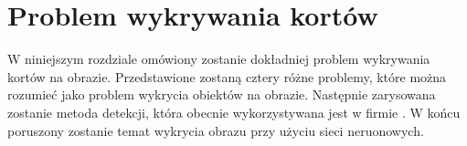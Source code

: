 \chapter{Problem wykrywania kortów}

W niniejszym rozdziale omówiony zostanie dokładniej problem wykrywania kortów na obrazie.
Przedstawione zostaną cztery różne problemy, które można rozumieć jako problem wykrycia obiektów na obrazie.
Następnie zarysowana zostanie metoda detekcji, która obecnie wykorzystywana jest w firmie \blue.
W końcu poruszony zostanie temat wykrycia obrazu przy użyciu sieci neruonowych.
